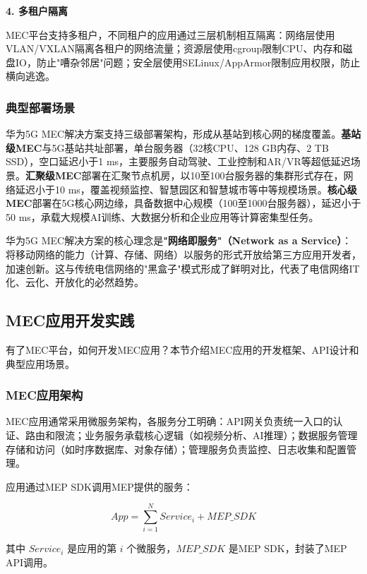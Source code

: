 \textbf{4. 多租户隔离}

MEC平台支持多租户，不同租户的应用通过三层机制相互隔离：网络层使用VLAN/VXLAN隔离各租户的网络流量；资源层使用cgroup限制CPU、内存和磁盘IO，防止"嘈杂邻居"问题；安全层使用SELinux/AppArmor限制应用权限，防止横向逃逸。

\subsubsection{典型部署场景}

华为5G MEC解决方案支持三级部署架构，形成从基站到核心网的梯度覆盖。\textbf{基站级MEC}与5G基站共址部署，单台服务器（32核CPU、128 GB内存、2 TB SSD），空口延迟小于1 ms，主要服务自动驾驶、工业控制和AR/VR等超低延迟场景。\textbf{汇聚级MEC}部署在汇聚节点机房，以10至100台服务器的集群形式存在，网络延迟小于10 ms，覆盖视频监控、智慧园区和智慧城市等中等规模场景。\textbf{核心级MEC}部署在5G核心网边缘，具备数据中心规模（100至1000台服务器），延迟小于50 ms，承载大规模AI训练、大数据分析和企业应用等计算密集型任务。

华为5G MEC解决方案的核心理念是\textbf{"网络即服务"（Network as a Service）}：将移动网络的能力（计算、存储、网络）以服务的形式开放给第三方应用开发者，加速创新。这与传统电信网络的"黑盒子"模式形成了鲜明对比，代表了电信网络IT化、云化、开放化的必然趋势。

\subsection{MEC应用开发实践}

有了MEC平台，如何开发MEC应用？本节介绍MEC应用的开发框架、API设计和典型应用场景。

\subsubsection{MEC应用架构}

MEC应用通常采用微服务架构，各服务分工明确：API网关负责统一入口的认证、路由和限流；业务服务承载核心逻辑（如视频分析、AI推理）；数据服务管理存储和访问（如时序数据库、对象存储）；管理服务负责监控、日志收集和配置管理。

应用通过MEP SDK调用MEP提供的服务：

\begin{equation}
App = \sum_{i=1}^{N} Service_i + MEP\_SDK
\end{equation}

其中 $Service_i$ 是应用的第 $i$ 个微服务，$MEP\_SDK$ 是MEP SDK，封装了MEP API调用。

